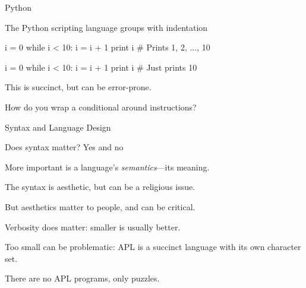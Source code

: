 \documentclass{plt}
\begin{document}
%
%
%
%
%
%
%
%

\begin{frame}[fragile]{Python}

The Python scripting language groups with indentation

\begin{python}
i = 0
while i < 10:
    i = i + 1
    print i    # Prints 1, 2, ..., 10

i = 0
while i < 10:
    i = i + 1
print i        # Just prints 10
\end{python}

This is succinct, but can be error-prone.

How do you wrap a conditional around instructions?

\end{frame}

\begin{frame}[fragile]{Syntax and Language Design}

Does syntax matter?  Yes and no

More important is a language's \emph{semantics}---its meaning.

The syntax is aesthetic, but can be a religious issue.

But aesthetics matter to people, and can be critical.

Verbosity does matter: smaller is usually better.

Too small can be problematic: APL is a succinct language with its
own character set.

There are no APL programs, only puzzles.

\end{frame}
\end{document}
